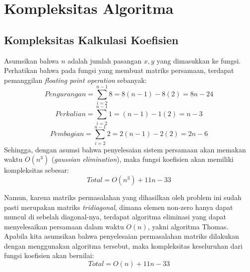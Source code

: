 \documentclass[journal,12pt,onecolumn,a4paper]{IEEEtran}
\begin{document}
\section{Kompleksitas Algoritma}
\subsection{Kompleksitas Kalkulasi Koefisien}

Asumsikan bahwa \(n\) adalah jumlah pasangan \(x, y\) yang dimasukkan ke fungsi. Perhatikan bahwa pada fungsi yang membuat matriks persamaan, terdapat pemanggilan \emph{floating point operation} sebanyak:
\begin{equation}
	Pengurangan = \sum_{i=2}^{n-1} 8 = 8(n-1) - 8(2) = 8n-24
\end{equation}
\begin{equation}
	Perkalian = \sum_{i=2}^{n-1} 1 = (n-1) - 1(2) = n - 3
\end{equation}
\begin{equation}
	Pembagian = \sum_{i=2}^{n-1} 2 = 2(n-1) - 2(2) = 2n - 6
\end{equation}
Sehingga, dengan asumsi bahwa penyelesaian sistem persamaan akan memakan waktu \(O(n^3)\) (\emph{gaussian elimination}), maka fungsi koefisien akan memiliki kompleksitas sebesar:
\begin{equation}
	Total = O(n^3) + 11n - 33
\end{equation}

Namun, karena matriks permasalahan yang dihasilkan oleh problem ini sudah pasti merupakan matriks \emph{tridiagonal}, dimana elemen non-zero hanya dapat muncul di sebelah diagonal-nya, terdapat algoritma eliminasi yang dapat menyelesaikan persamaan dalam waktu \(O(n)\), yakni algoritma Thomas. Apabila kita asumsikan bahwa penyelesaian permasalahan matriks dilakukan dengan menggunakan algoritma tersebut, maka kompleksitas keseluruhan dari fungsi koefisien akan bernilai:
\begin{equation}
	Total = O(n) + 11n - 33
\end{equation}
\end{document}
